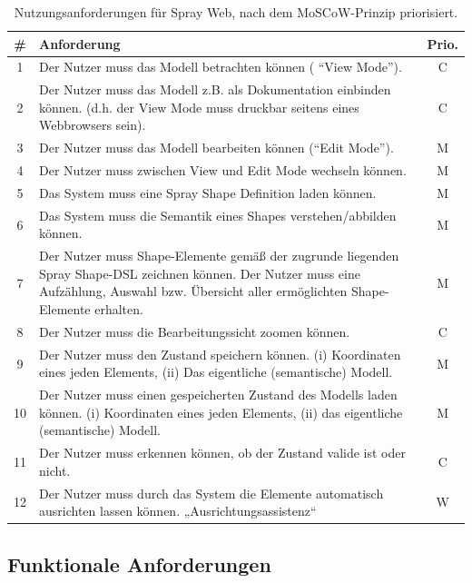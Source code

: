 \begin{table}[tbp]
  \begin{tabular}{ | c | p{10cm} | c | }
    \hline
    \# & Anforderung & Prio. \\ \hline \hline
    1  & Der Nutzer muss das Modell betrachten können ( “View Mode”). & C \\ \hline
    2  & Der Nutzer muss das Modell z.B. als Dokumentation einbinden können. (d.h. der View Mode muss druckbar seitens eines Webbrowsers sein). & C \\ \hline
    3  & Der Nutzer muss das Modell bearbeiten können (“Edit Mode”). & M \\ \hline
    4  & Der Nutzer muss zwischen View und Edit Mode wechseln können. & M \\ \hline
    5  & Das System muss eine Spray Shape Definition laden können. & M \\ \hline
    6  & Das System muss die Semantik eines Shapes verstehen/abbilden können. & M \\ \hline
    7  & Der Nutzer muss Shape-Elemente gemäß der zugrunde liegenden Spray Shape-DSL zeichnen können. Der Nutzer muss eine Aufzählung, Auswahl bzw. Übersicht aller ermöglichten Shape-Elemente erhalten. & M \\ \hline
    8  & Der Nutzer muss die Bearbeitungssicht zoomen können. & C \\ \hline
    9  & Der Nutzer muss den Zustand speichern können. (i) Koordinaten eines jeden Elements, (ii) Das eigentliche (semantische) Modell. & M \\ \hline
    10 & Der Nutzer muss einen gespeicherten Zustand des Modells laden können.
(i) Koordinaten eines jeden Elements, (ii)
das eigentliche (semantische) Modell. & M \\ \hline
    11 & Der Nutzer muss erkennen können, ob der Zustand valide ist oder nicht. & C \\ \hline
    12 & Der Nutzer muss durch das System die Elemente automatisch ausrichten lassen können. „Ausrichtungsassistenz“ & W \\
    \hline  
  \end{tabular}
  \caption{Nutzungsanforderungen für Spray Web,
           nach dem MoSCoW-Prinzip priorisiert.}\label{tbl.nutz}
\end{table}

\subsection{Funktionale Anforderungen}\label{sec.funcAnforderung}

